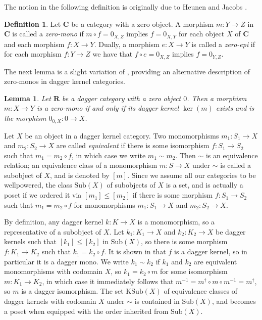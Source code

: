 \documentclass[12pt]{tac}
\newtheorem{lemma}[theorem]{Lemma}
\theoremstyle{definition}
\newtheorem{definition}[theorem]{Definition}
\theoremstyle{remark}
\newcommand{\<}{\langle}
\renewcommand{\>}{\rangle}
\renewcommand{\:}{\colon}
\begin{document}
The notion in the following  definition is originally due to Heunen and Jacobs \cite{heunenjacobs}.
\begin{definition}\label{def:delta}
    Let $\mathbf C$ be a category with a zero object. A morphism $m:Y\to Z$ in $\mathbf C$ is called a \emph{zero-mono} if $m\circ f=0_{X,Z}$ implies $f=0_{X,Y}$ for each object $X$ of $\mathbf C$ and each morphism $f:X\to Y$.  Dually, a morphism $e:X\to Y$ is called a \emph{zero-epi} if for each morphism $f:Y\to Z$ we have that $f\circ e=0_{X,Z}$ implies $f=0_{Y,Z}$.
\end{definition}


The next lemma is a slight variation of \cite[Lemma 4]{heunenjacobs}, providing an alternative description of zero-monos in dagger kernel categories.
\begin{lemma}\label{lem:alternative-description-zero-monos}
    Let $\mathbf R$ be a dagger category with a zero object $0$. Then a morphism $m:X\to Y$ is a zero-mono if and only if its dagger kernel $\ker(m)$ exists and is the morphism $0_{0,X}:0\to X$.
\end{lemma}




Let $X$ be an object in a dagger kernel category. Two monomorphisms $m_1:S_1\to X$ and $m_2:S_2\to X$ are called \emph{equivalent} if there is some isomorphism $f:S_1\to S_2$ such that $m_1=m_2\circ f$, in which case we write $m_1\sim m_2$. Then $\sim$ is an equivalence relation; an equivalence class of a monomorphism $m:S\to X$ under $\sim$ is called a subobject of $X$, and is denoted by $[m]$. Since we assume all our categories to be wellpowered, the class $\mathrm{Sub}(X)$ of subobjects of $X$ is a set, and is actually a poset if we ordered it via $[m_1]\leq[m_2]$ if there is some morphism $f:S_1\to S_2$ such that $m_1=m_2\circ f$ for monomorphisms $m_1:S_1\to X$ and $m_2:S_2\to X$.

By definition, any dagger kernel $k:K\to X$ is a monomorphism, so a representative of a subobject of $X$. Let $k_1:K_1\to X$ and $k_2:K_2\to X$ be dagger kernels such that $[k_1]\leq[k_2]$ in $\mathrm{Sub}(X)$, so there is some morphism $f:K_1\to K_2$ such that $k_1=k_2\circ f$. It is shown in \cite[Lemma 1]{heunenjacobs} that $f$ is a dagger kernel, so in particular it is a dagger mono. We write $k_1\sim k_2$ if $k_1$ and $k_2$ are equivalent monomorphisms with codomain $X$, so $k_1=k_2\circ m$ for some isomorphism $m:K_1\to K_2$, in which case it immediately follows that  $m^{-1}=m^\dag\circ m\circ m^{-1}=m^\dag$, so $m$ is a dagger isomorphism. The set $\mathrm{KSub}(X)$ of equivalence classes of dagger kernels with codomain $X$ under $\sim$ is contained in $\mathrm{Sub}(X)$, and becomes a poset when equipped with the order inherited from $\mathrm{Sub}(X)$. 
\end{document}
